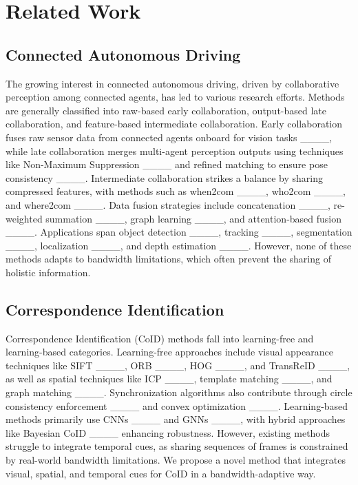 \section{Related Work}
\label{sec:related}
\subsection{Connected Autonomous Driving} The growing interest in connected autonomous driving, driven by collaborative perception among connected agents, has led to various research efforts. Methods are generally classified into raw-based early collaboration, output-based late collaboration, and feature-based intermediate collaboration. Early collaboration fuses raw sensor data from connected agents onboard for vision tasks ____, while late collaboration merges multi-agent perception outputs using techniques like Non-Maximum Suppression ____ and refined matching to ensure pose consistency ____. Intermediate collaboration strikes a balance by sharing compressed features, with methods such as when2com ____, who2com ____, and where2com ____. Data fusion strategies include concatenation ____, re-weighted summation ____, graph learning ____, and attention-based fusion ____. Applications span object detection ____, tracking ____, segmentation ____, localization ____, and depth estimation ____. However, none of these methods adapts to bandwidth limitations, which often prevent the sharing of holistic information.

\subsection{Correspondence Identification} Correspondence Identification (CoID) methods fall into learning-free and learning-based categories. Learning-free approaches include visual appearance techniques like SIFT ____, ORB ____, HOG ____, and TransReID ____, as well as spatial techniques like ICP ____, template matching ____, and graph matching ____. Synchronization algorithms also contribute through circle consistency enforcement ____ and convex optimization ____. Learning-based methods primarily use CNNs ____ and GNNs ____, with hybrid approaches like Bayesian CoID ____ enhancing robustness. However, existing methods struggle to integrate temporal cues, as sharing sequences of frames is constrained by real-world bandwidth limitations. We propose a novel method that integrates visual, spatial, and temporal cues for CoID in a bandwidth-adaptive way.

